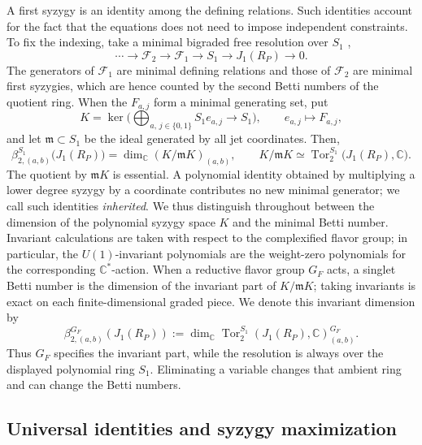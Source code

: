 \documentclass[10pt,reqno]{amsart}
\numberwithin{equation}{section}
\theoremstyle{plain}
\theoremstyle{definition}
\DeclareMathOperator{\Tor}{Tor}
\begin{document}
A first syzygy is an identity among the defining relations. Such identities account for the fact that the equations does not need to impose independent constraints. To fix the indexing, take a minimal bigraded free resolution over $S_1$ \cite{Eisenbud},
\begin{equation*}
	\cdots\longrightarrow\mathcal F_2\longrightarrow\mathcal F_1\longrightarrow S_1\longrightarrow J_1(R_P)\longrightarrow0 .
\end{equation*}
The generators of $\mathcal F_1$ are minimal defining relations and those of $\mathcal F_2$ are minimal first syzygies, which are hence counted by the second Betti numbers of the quotient ring. When the $F_{a,j}$ form a minimal generating set, put
\begin{equation*}
	K=\ker\Big(\bigoplus_{a,\,j\in\{0,1\}}S_1e_{a,j}\longrightarrow S_1\Big),\qquad e_{a,j}\longmapsto F_{a,j},
\end{equation*}
and let $\mathfrak{m}\subset S_1$ be the ideal generated by all jet coordinates. Then,
\begin{equation}\label{eq:betti}
	\beta^{S_1}_{2,(a,b)}\big(J_1(R_P)\big)=\dim_\mathbb{C}(K/\mathfrak{m} K)_{(a,b)},\qquad K/\mathfrak{m} K\simeq\Tor^{S_1}_2\big(J_1(R_P),\mathbb{C}\big).
\end{equation}
The quotient by $\mathfrak{m} K$ is essential. A polynomial identity obtained by multiplying a lower degree syzygy by a coordinate contributes no new minimal generator; we call such identities \emph{inherited}. We thus distinguish throughout between the dimension of the polynomial syzygy space $K$ and the minimal Betti number. Invariant calculations are taken with respect to the complexified flavor group; in particular, the $U(1)$-invariant polynomials are the weight-zero polynomials for the corresponding $\mathbb C^*$-action. When a reductive flavor group $G_F$ acts, a singlet Betti number is the dimension of the invariant part of $K/\mathfrak{m} K$; taking invariants is exact on each finite-dimensional graded piece. We denote this invariant dimension by
\begin{equation*}
    \beta^{G_F}_{2,(a,b)}(J_1(R_P))
    :=\dim_\mathbb C\Tor^{S_1}_2(J_1(R_P),\mathbb C)^{G_F}_{(a,b)}.
\end{equation*}
Thus $G_F$ specifies the invariant part, while the resolution is always over the displayed polynomial ring $S_1$. Eliminating a variable changes that ambient ring and can change the Betti numbers.

\subsection{Universal identities and syzygy maximization}\label{sec:universal}
\end{document}
